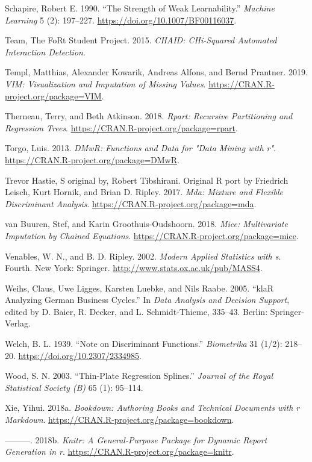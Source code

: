 \documentclass[
]{book}
\newlength{\cslhangindent}
\newenvironment{CSLReferences}[2] %
 {\begin{list}{}{%
  \setlength{\itemindent}{0pt}
  \setlength{\leftmargin}{0pt}
  \setlength{\parsep}{0pt}
  \ifodd #1
   \setlength{\leftmargin}{\cslhangindent}
   \setlength{\itemindent}{-1\cslhangindent}
  \fi
  \setlength{\itemsep}{#2\baselineskip}}}
 {\end{list}}
\theoremstyle{plain}
\theoremstyle{definition}
\theoremstyle{definition}
\theoremstyle{definition}
\theoremstyle{definition}
\theoremstyle{definition}
\theoremstyle{remark}
\begin{document}
\begin{CSLReferences}{1}{0}
Schapire, Robert E. 1990. {``The Strength of Weak Learnability.''} \emph{Machine Learning} 5 (2): 197--227. \url{https://doi.org/10.1007/BF00116037}.

Team, The FoRt Student Project. 2015. \emph{CHAID: CHi-Squared Automated Interaction Detection}.

Templ, Matthias, Alexander Kowarik, Andreas Alfons, and Bernd Prantner. 2019. \emph{VIM: Visualization and Imputation of Missing Values}. \url{https://CRAN.R-project.org/package=VIM}.

Therneau, Terry, and Beth Atkinson. 2018. \emph{Rpart: Recursive Partitioning and Regression Trees}. \url{https://CRAN.R-project.org/package=rpart}.

Torgo, Luis. 2013. \emph{DMwR: Functions and Data for "Data Mining with r"}. \url{https://CRAN.R-project.org/package=DMwR}.

Trevor Hastie, S original by, Robert Tibshirani. Original R port by Friedrich Leisch, Kurt Hornik, and Brian D. Ripley. 2017. \emph{Mda: Mixture and Flexible Discriminant Analysis}. \url{https://CRAN.R-project.org/package=mda}.

van Buuren, Stef, and Karin Groothuis-Oudshoorn. 2018. \emph{Mice: Multivariate Imputation by Chained Equations}. \url{https://CRAN.R-project.org/package=mice}.

Venables, W. N., and B. D. Ripley. 2002. \emph{Modern Applied Statistics with s}. Fourth. New York: Springer. \url{http://www.stats.ox.ac.uk/pub/MASS4}.

Weihs, Claus, Uwe Ligges, Karsten Luebke, and Nils Raabe. 2005. {``klaR Analyzing German Business Cycles.''} In \emph{Data Analysis and Decision Support}, edited by D. Baier, R. Decker, and L. Schmidt-Thieme, 335--43. Berlin: Springer-Verlag.

Welch, B. L. 1939. {``Note on {Discriminant Functions}.''} \emph{Biometrika} 31 (1/2): 218--20. \url{https://doi.org/10.2307/2334985}.

Wood, S. N. 2003. {``Thin-Plate Regression Splines.''} \emph{Journal of the Royal Statistical Society (B)} 65 (1): 95--114.

Xie, Yihui. 2018a. \emph{Bookdown: Authoring Books and Technical Documents with r Markdown}. \url{https://CRAN.R-project.org/package=bookdown}.

---------. 2018b. \emph{Knitr: A General-Purpose Package for Dynamic Report Generation in r}. \url{https://CRAN.R-project.org/package=knitr}.

\end{CSLReferences}
\end{document}
